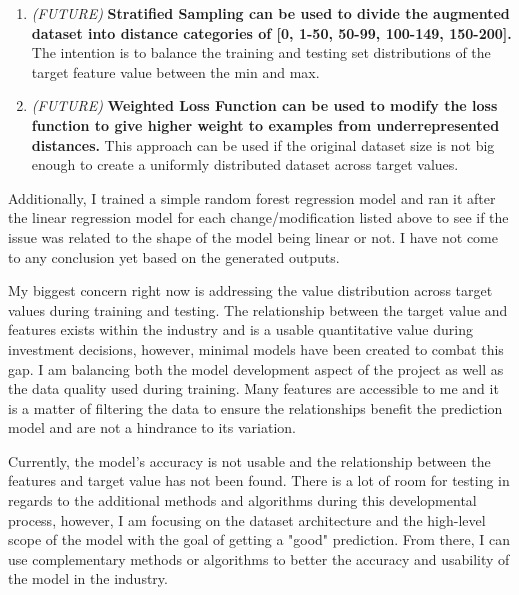 \begin{enumerate}
    \item \textit{(FUTURE)} \textbf{Stratified Sampling can be used to divide the augmented dataset into distance categories of [0, 1-50, 50-99, 100-149, 150-200].} The intention is to balance the training and testing set distributions of the target feature value between the min and max.
    \item \textit{(FUTURE)} \textbf{Weighted Loss Function can be used to modify the loss function to give higher weight to examples from underrepresented distances.} This approach can be used if the original dataset size is not big enough to create a uniformly distributed dataset across target values.
    \end{enumerate}
    
Additionally, I trained a simple random forest regression model and ran it after the linear regression model for each change/modification listed above to see if the issue was related to the shape of the model being linear or not. I have not come to any conclusion yet based on the generated outputs. 

My biggest concern right now is addressing the value distribution across target values during training and testing. The relationship between the target value and features exists within the industry and is a usable quantitative value during investment decisions, however, minimal models have been created to combat this gap. I am balancing both the model development aspect of the project as well as the data quality used during training. Many features are accessible to me and it is a matter of filtering the data to ensure the relationships benefit the prediction model and are not a hindrance to its variation.

Currently, the model's accuracy is not usable and the relationship between the features and target value has not been found. There is a lot of room for testing in regards to the additional methods and algorithms during this developmental process, however, I am focusing on the dataset architecture and the high-level scope of the model with the goal of getting a "good" prediction. From there, I can use complementary methods or algorithms to better the accuracy and usability of the model in the industry. 
